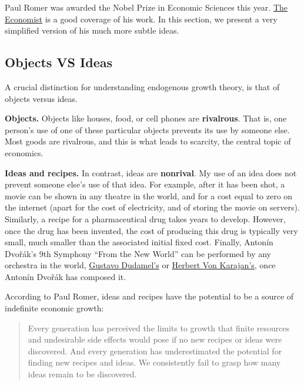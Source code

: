 \documentclass[]{book}
\theoremstyle{definition}
\theoremstyle{definition}
\theoremstyle{definition}
\theoremstyle{remark}
\begin{document}
Paul Romer was awarded the Nobel Prize in Economic Sciences this year.
\href{https://www.economist.com/finance-and-economics/2018/10/13/paul-romer-and-william-nordhaus-win-the-economics-nobel?fsrc=scn/fb/te/bl/ed/paulromerandwilliamnordhauswintheeconomicsnobelfreeexchange}{The
Economist} is a good coverage of his work. In this section, we present a
very simplified version of his much more subtle ideas.

\subsection{Objects VS Ideas}\label{objects-vs-ideas}

A crucial distinction for understanding endogenous growth theory, is
that of objects versus ideas.

\textbf{Objects.} Objects like houses, food, or cell phones are
\textbf{rivalrous}. That is, one person's use of one of these particular
objects prevents its use by someone else. Most goods are rivalrous, and
this is what leads to scarcity, the central topic of economics.

\textbf{Ideas and recipes.} In contrast, ideas are \textbf{nonrival}. My
use of an idea does not prevent someone else's use of that idea. For
example, after it has been shot, a movie can be shown in any theatre in
the world, and for a cost equal to zero on the internet (apart for the
cost of electricity, and of storing the movie on servers). Similarly, a
recipe for a pharmaceutical drug takes years to develop. However, once
the drug has been invented, the cost of producing this drug is typically
very small, much smaller than the associated initial fixed cost.
Finally, Antonín Dvořák's 9th Symphony ``From the New World'' can be
performed by any orchestra in the world,
\href{https://www.youtube.com/watch?v=vHqtJH2f1Yk}{Gustavo Dudamel's} or
\href{https://www.youtube.com/watch?v=0hmjGbh9qdg\&start_radio=1\&list=RD0hmjGbh9qdg\&t=193}{Herbert
Von Karajan's}, once Antonín Dvořák has composed it.

According to Paul Romer, ideas and recipes have the potential to be a
source of indefinite economic growth:

\begin{quote}
Every generation has perceived the limits to growth that finite
resources and undesirable side effects would pose if no new recipes or
ideas were discovered. And every generation has underestimated the
potential for finding new recipes and ideas. We consistently fail to
grasp how many ideas remain to be discovered.
\end{quote}
\end{document}
